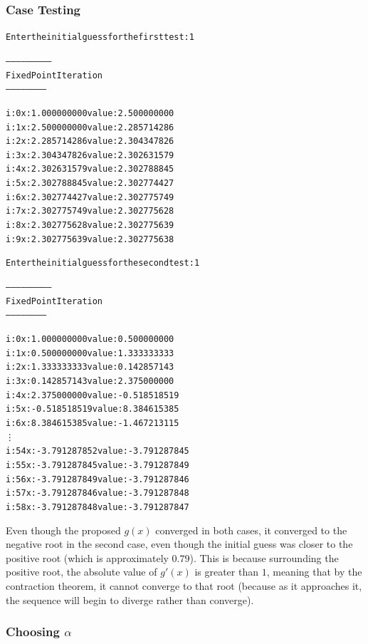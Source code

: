 \documentclass[11pt]{article} %
\begin{document}
\subsubsection*{Case Testing}
\begin{alltt}
Enter the initial guess for the first test: 1 

--------------------------
 Fixed Point Iteration
 -----------------------


i: 0	x: 1.000000000	value: 2.500000000
i: 1	x: 2.500000000	value: 2.285714286
i: 2	x: 2.285714286	value: 2.304347826
i: 3	x: 2.304347826	value: 2.302631579
i: 4	x: 2.302631579	value: 2.302788845
i: 5	x: 2.302788845	value: 2.302774427
i: 6	x: 2.302774427	value: 2.302775749
i: 7	x: 2.302775749	value: 2.302775628
i: 8	x: 2.302775628	value: 2.302775639
i: 9	x: 2.302775639	value: 2.302775638

Enter the initial guess for the second test:  1

--------------------------
 Fixed Point Iteration
 -----------------------


i: 0	x: 1.000000000	value: 0.500000000
i: 1	x: 0.500000000	value: 1.333333333
i: 2	x: 1.333333333	value: 0.142857143
i: 3	x: 0.142857143	value: 2.375000000
i: 4	x: 2.375000000	value: -0.518518519
i: 5	x: -0.518518519	value: 8.384615385
i: 6	x: 8.384615385	value: -1.467213115
\vdots
i: 54	x: -3.791287852	value: -3.791287845
i: 55	x: -3.791287845	value: -3.791287849
i: 56	x: -3.791287849	value: -3.791287846
i: 57	x: -3.791287846	value: -3.791287848
i: 58	x: -3.791287848	value: -3.791287847
\end{alltt}
\par Even though the proposed $g(x)$ converged in both cases, it converged to the negative root in the second case, even though the initial guess
was closer to the positive root (which is approximately $0.79$). This is because surrounding the positive root, the absolute value of $g'(x)$ is greater than $1$, meaning that by the contraction theorem, it cannot converge to that root (because as it approaches it, the sequence will begin to diverge rather than converge).

\subsubsection*{Choosing $\alpha$}

\end{document}
